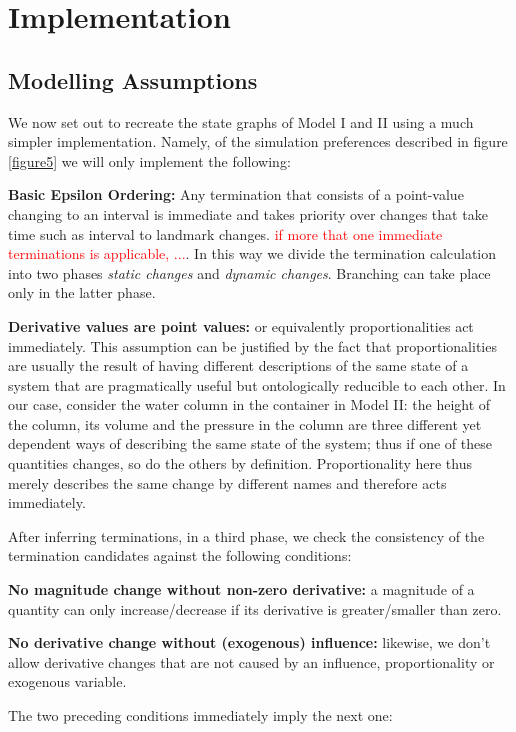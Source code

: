 \documentclass{article}
\begin{document}
\section{Implementation}

\subsection{Modelling Assumptions}

We now set out to recreate the state graphs of Model I and II using a much simpler implementation. Namely, of the simulation preferences described in figure \ref{figure5} we will only implement the following:


\textbf{Basic Epsilon Ordering:} Any termination that consists of a point-value changing to an interval is immediate and takes priority over changes that take time such as interval to landmark changes. \textcolor{red}{if more that one immediate terminations is applicable, ...}. In this way we divide the termination calculation into two phases \textit{static changes} and \textit{dynamic changes}. Branching can take place only in the latter phase.

\textbf{Derivative values are point values:} or equivalently proportionalities act immediately. This assumption can be justified by the fact that proportionalities are usually the result of having different descriptions of the same state of a system that are pragmatically useful but ontologically reducible to each other. In our case, consider the water column in the container in Model II: the height of the column, its volume and the pressure in the column are three different yet dependent ways of describing the same state of the system; thus if one of these quantities changes, so do the others by definition. Proportionality here thus merely describes the same change by different names and therefore acts immediately.

After inferring terminations, in a third phase, we check the consistency of the termination candidates against the following conditions:

\textbf{No magnitude change without non-zero derivative:} a magnitude of a quantity can only increase/decrease if its derivative is greater/smaller than zero. 

\textbf{No derivative change without (exogenous) influence:} likewise, we don't allow derivative changes that are not caused by an influence, proportionality or exogenous variable. 

\noindent The two preceding conditions immediately imply the next one:
\end{document}
